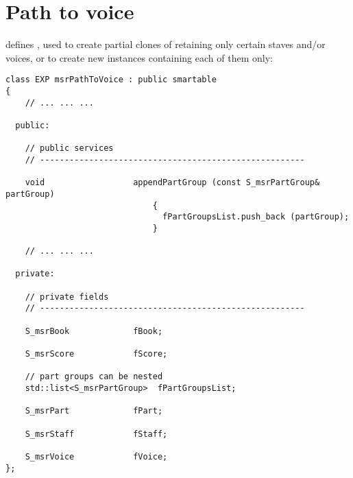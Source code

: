 
\chapter{Path to voice}\label{Path to voice}

 defines , used to create partial clones of  retaining only certain staves and/or voices, or to create new  instances containing each of them only:
\begin{lstlisting}[language=CPlusPlus]
class EXP msrPathToVoice : public smartable
{
	// ... ... ...

  public:

    // public services
    // ------------------------------------------------------

    void                  appendPartGroup (const S_msrPartGroup& partGroup)
                              {
                                fPartGroupsList.push_back (partGroup);
                              }

	// ... ... ...

  private:

    // private fields
    // ------------------------------------------------------

    S_msrBook             fBook;

    S_msrScore            fScore;

    // part groups can be nested
    std::list<S_msrPartGroup>  fPartGroupsList;

    S_msrPart             fPart;

    S_msrStaff            fStaff;

    S_msrVoice            fVoice;
};
\end{lstlisting}

